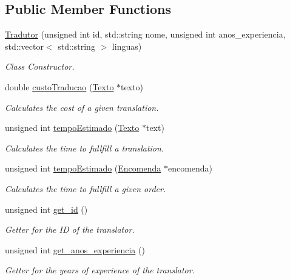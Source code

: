 \subsection*{Public Member Functions}
\begin{DoxyCompactItemize}
\item 
\hyperlink{class_tradutor_a856f362e6c97ea42d04875e6c9d012e3}{Tradutor} (unsigned int id, std\-::string nome, unsigned int anos\-\_\-experiencia, std\-::vector$<$ std\-::string $>$ linguas)
\begin{DoxyCompactList}\small\item\em Class Constructor. \end{DoxyCompactList}\item 
double \hyperlink{class_tradutor_ab55718903fb3e7cc5c1b21b87d64393a}{custo\-Traducao} (\hyperlink{class_texto}{Texto} $\ast$texto)
\begin{DoxyCompactList}\small\item\em Calculates the cost of a given translation. \end{DoxyCompactList}\item 
unsigned int \hyperlink{class_tradutor_a1ca7c608db7e9145e8b9105e19e5900a}{tempo\-Estimado} (\hyperlink{class_texto}{Texto} $\ast$text)
\begin{DoxyCompactList}\small\item\em Calculates the time to fullfill a translation. \end{DoxyCompactList}\item 
unsigned int \hyperlink{class_tradutor_acd53cf00b851be61350100c9aa6ef3c0}{tempo\-Estimado} (\hyperlink{class_encomenda}{Encomenda} $\ast$encomenda)
\begin{DoxyCompactList}\small\item\em Calculates the time to fullfill a given order. \end{DoxyCompactList}\item 
unsigned int \hyperlink{class_tradutor_adc3d4f5ae46ebd92072c644f9fe0e479}{get\-\_\-id} ()
\begin{DoxyCompactList}\small\item\em Getter for the I\-D of the translator. \end{DoxyCompactList}\item 
unsigned int \hyperlink{class_tradutor_a001f11f69661085cb11192d3c6f5d556}{get\-\_\-anos\-\_\-experiencia} ()
\begin{DoxyCompactList}\small\item\em Getter for the years of experience of the translator. \end{DoxyCompactList}\item 

\end{DoxyCompactItemize}
